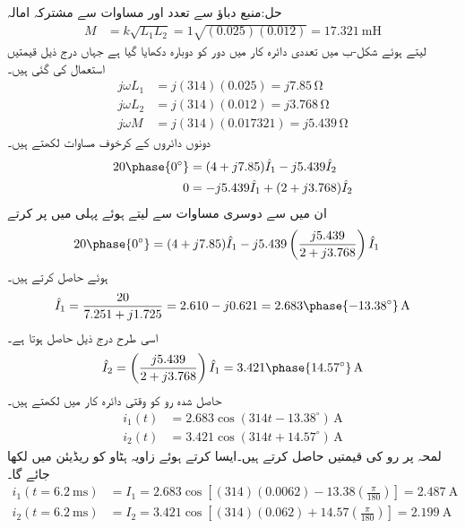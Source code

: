 حل:منبع دباؤ سے تعدد  اور مساوات  سے مشترکہ امالہ
\begin{align*}
M&=k\sqrt{L_1 L_2}=1\sqrt{(0.025)(0.012)}=\SI{17.321}{\milli\henry}
\end{align*}
لیتے ہوئے شکل-ب میں تعددی دائرہ کار میں دور کو دوبارہ دکھایا گیا ہے جہاں درج ذیل قیمتیں استعمال کی گئی ہیں۔
\begin{align*}
j\omega L_1&=j (314)(0.025)=j7.85\,\si{\ohm}\\
j\omega L_2&=j(314)(0.012)=j3.768\,\si{\ohm}\\
j\omega M&=j (314)(0.017321)=j5.439\,\si{\ohm}
\end{align*}
دونوں دائروں کے کرخوف مساوات لکھتے ہیں۔
\begin{align*}
20\phase{0^{\circ}}&=(4+j7.85)\hat{I}_1-j5.439\hat{I}_2\\
0&=-j5.439\hat{I}_1+(2+j3.768)\hat{I}_2
\end{align*}
ان میں سے دوسری مساوات سے  لیتے ہوئے پہلی میں پر کرتے
\begin{align*}
20\phase{0^{\circ}}&=(4+j7.85)\hat{I}_1-j5.439\left(\frac{j5.439 }{2+j3.768}\right)\hat{I}_1
\end{align*}
ہوئے  حاصل کرتے ہیں۔
\begin{align*}
\hat{I}_1=\frac{20}{7.251+j1.725}=2.610-j0.621=2.683\phase{-13.38^{\circ}}\,\si{\ampere}
\end{align*}
اسی طرح  درج ذیل حاصل ہوتا ہے۔
\begin{align*}
\hat{I}_2=\left(\frac{j5.439}{2+j3.768}\right) \hat{I}_1=3.421\phase{14.57^{\circ}}\,\si{\ampere}
\end{align*}
حاصل شدہ رو کو وقتی دائرہ کار میں لکھتے ہیں۔
\begin{align*}
i_1(t)&=2.683\cos(314t-13.38^{\circ}) \, \si{\ampere}\\
i_2(t)&=3.421\cos(314t+14.57^{\circ})\,\si{\ampere}
\end{align*}
لمحہ  پر رو کی قیمتیں حاصل کرتے ہیں۔ایسا کرتے ہوئے زاویہ ہٹاو کو ریڈیئن میں لکھا جائے گا۔
\begin{align*}
i_1(t=\SI{6.2}{\milli\second})&=I_1=2.683\cos\left[(314)(0.0062)-13.38\left(\frac{\pi}{180}\right)\right]=\SI{2.487}{\ampere}\\
i_2(t=\SI{6.2}{\milli\second})&=I_2=3.421\cos\left[(314)(0.062)+14.57\left(\frac{\pi}{180}\right)\right]=\SI{2.199}{\ampere}
\end{align*}
